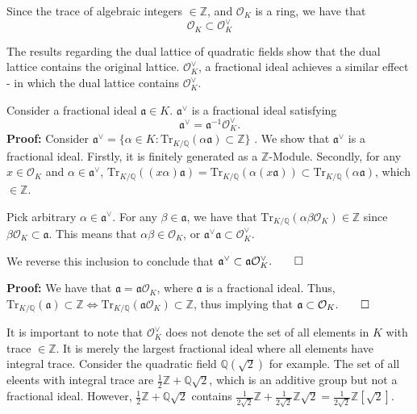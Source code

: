 \documentclass[a4paper, 12pt,oneside,openany]{book}
\begin{document}
Since the trace of algebraic integers $\in \mathbb{Z}$, and $\mathcal{O}_K$ is a ring, we have that $$\mathcal{O}_K \subset \mathcal{O}_K^{\vee}$$

The results regarding the dual lattice of quadratic fields show that the dual lattice contains the original lattice. $\mathcal{O}_K^{\vee}$, a fractional ideal achieves a similar effect - in which the dual lattice contains $\mathcal{O}_K^{\vee}$. 

Consider a fractional ideal $\mathfrak{a} \in K$. $\mathfrak{a}^{\vee}$ is a fractional ideal satisfying $$\mathfrak{a}^{\vee}=\mathfrak{a}^{-1} \mathcal{O}_K^{\vee}.$$
\textbf{Proof:} Consider $\mathfrak{a}^{\vee} = \{\alpha \in K: \text{Tr}_{K/\mathbb{Q}}(\alpha\mathfrak{a}) \subset \mathbb{Z}\}$ . We show that $\mathfrak{a}^{\vee}$ is a fractional ideal. Firstly, it is finitely generated as a $\mathbb{Z}$-Module. Secondly, for any $x \in \mathcal{O}_K$ and $\alpha \in \mathfrak{a}^{\vee}$, $\text{Tr}_{K/\mathbb{Q}}((x\alpha)\mathfrak{a})=\text{Tr}_{K/\mathbb{Q}}(\alpha(x\mathfrak{a})) \subset \text{Tr}_{K/\mathbb{Q}}(\alpha \mathfrak{a})$, which $\in \mathbb{Z}$.

Pick arbitrary $\alpha \in \mathfrak{a}^{\vee}.$ For any $\beta \in \mathfrak{a}$, we have that $\text{Tr}_{K/\mathbb{Q}}(\alpha\beta\mathcal{O}_K) \in \mathbb{Z}$ since $\beta\mathcal{O}_K \subset \mathfrak{a}$. This means that $\alpha\beta \in \mathcal{O}_K$, or $\mathfrak{a}^{\vee}\mathfrak{a} \subset \mathcal{O}_K^{\vee}.$

We reverse this inclusion to conclude that $\mathfrak{a}^{\vee} \subset \mathfrak{a}\mathcal{O}_K^{\vee}. \qed$


\textbf{Proof:} We have that $\mathfrak{a}=\mathfrak{a}\mathcal{O}_K$, where $\mathfrak{a}$ is a fractional ideal. Thus, $\text{Tr}_{K/\mathbb{Q}}(\mathfrak{a}) \subset \mathbb{Z} \iff \text{Tr}_{K/\mathbb{Q}}(\mathfrak{a}\mathcal{O}_K) \subset \mathbb{Z}$, thus implying that $\mathfrak{a}\subset\mathcal{O}_K. \qed$ 

It is important to note that $\mathcal{O}_K^{\vee}$ does not denote the set of all elements in $K$ with trace $\in \mathbb{Z}$. It is merely the largest fractional ideal where all elements have integral trace. Consider the quadratic field $\mathbb{Q}(\sqrt{2})$ for example. The set of all eleents with integral trace are $\frac{1}{2}\mathbb{Z}+\mathbb{Q}\sqrt{2}$, which is an additive group but not a fractional ideal. However, $\frac{1}{2}\mathbb{Z}+\mathbb{Q}\sqrt{2}$ contains $\frac{1}{2\sqrt{2}}\mathbb{Z}+\frac{1}{2\sqrt{2}}\mathbb{Z}\sqrt{2}=\frac{1}{2\sqrt{2}}\mathbb{Z}[\sqrt{2}].$ 
\end{document}
